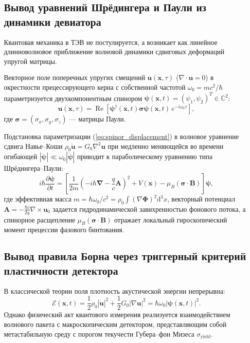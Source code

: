 \documentclass[12pt,a4paper]{article}
\theoremstyle{definition}
\theoremstyle{remark}
\begin{document}
\subsection{Вывод уравнений Шрёдингера и Паули из динамики девиатора}
Квантовая механика в ТЭВ не постулируется, а возникает как линейное длинноволновое приближение волновой динамики сдвиговых деформаций упругой матрицы.

Векторное поле поперечных упругих смещений $\mathbf{u}(\mathbf{x}, \tau)$ ($\nabla \cdot \mathbf{u} = 0$) в окрестности прецессирующего керна с собственной частотой $\omega_0 = m c^2 / \hbar$ параметризуется двухкомпонентным спинором $\boldsymbol{\psi}(\mathbf{x}, t) = (\psi_1, \psi_2)^T \in \mathbb{C}^2$:
\begin{equation}
	\mathbf{u}(\mathbf{x}, \tau) = \operatorname{Re}\left[ \boldsymbol{\psi}^\dagger(\mathbf{x}, t) \boldsymbol{\sigma} \boldsymbol{\psi}(\mathbf{x}, t) \, e^{-i \omega_0 \tau} \right],
	\label{eq:spinor_displacement}
\end{equation}
где $\boldsymbol{\sigma} = (\sigma_x, \sigma_y, \sigma_z)$ --- матрицы Паули.

Подстановка параметризации (\ref{eq:spinor_displacement}) в волновое уравнение сдвига Навье--Коши $\rho_0 \ddot{\mathbf{u}} = G_0 \nabla^2 \mathbf{u}$ при медленно меняющейся во времени огибающей $|\ddot{\boldsymbol{\psi}}| \ll \omega_0 |\dot{\boldsymbol{\psi}}|$ приводит к параболическому уравнению типа Шрёдингера--Паули:
\begin{equation}
	i \hbar \frac{\partial \boldsymbol{\psi}}{\partial t} = \left[ \frac{1}{2m} \left( -i\hbar \boldsymbol{\nabla} - \frac{q}{c}\mathbf{A} \right)^2 + V(\mathbf{x}) - \mu_B (\boldsymbol{\sigma} \cdot \mathbf{B}) \right] \boldsymbol{\psi},
	\label{eq:pauli_derived}
\end{equation}
где эффективная масса $m = \hbar \omega_0 / c^2 = \rho_0 \int (\nabla \boldsymbol{\Phi})^2 \mathrm{d}^3x$, векторный потенциал $\mathbf{A} = -\frac{\hbar c}{2q} \nabla \times \mathbf{u}_0$ задается гидродинамической завихренностью фонового потока, а спинорное расщепление $\mu_B (\boldsymbol{\sigma} \cdot \mathbf{B})$ отражает локальный гироскопический момент прецессии фазового бинтования.

\subsection{Вывод правила Борна через триггерный критерий пластичности детектора}
В классической теории поля плотность акустической энергии непрерывна:
\begin{equation}
	\mathcal{E}(\mathbf{x}, t) = \frac{1}{2}\rho_0 |\dot{\mathbf{u}}|^2 + \frac{1}{2}G_0 |\nabla \mathbf{u}|^2 = \hbar \omega_0 |\boldsymbol{\psi}(\mathbf{x}, t)|^2.
	\label{eq:wave_energy_density}
\end{equation}
Однако физический акт квантового измерения реализуется взаимодействием волнового пакета с макроскопическим детектором, представляющим собой метастабильную среду с порогом текучести Губера--фон Мизеса $\sigma_{\mathrm{yield}}$.
\end{document}
